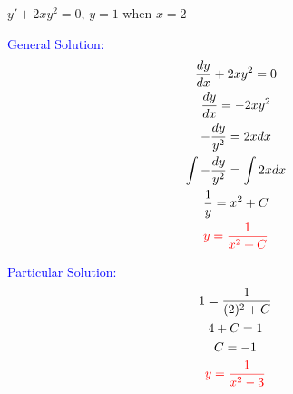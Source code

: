 \item $y' + 2xy^2 = 0$, $y=1$ when $x=2$

\textcolor{blue}{
    \begin{minipage}[t]{0.45\textwidth}
        General Solution:
        \begin{gather*}
            \frac{dy}{dx} + 2xy^2 = 0\\
            \frac{dy}{dx} =- 2xy^2 \\
            -\frac{dy}{y^2} = 2xdx \\
            \int-\frac{dy}{y^2} = \int2xdx \\
            \frac{1}{y}=x^2+C\\
            \textcolor{red}{
            y=\frac{1}{x^2+C}
            }
        \end{gather*}
    \end{minipage}
    \hfill
    \begin{minipage}[t]{0.45\textwidth}
        Particular Solution:
        \begin{gather*}
            1=\frac{1}{(2)^2+C}\\
            4+C=1\\
            C=-1\\
            \textcolor{red}{
                y=\frac{1}{x^2-3}
            }
        \end{gather*}
    \end{minipage}
}